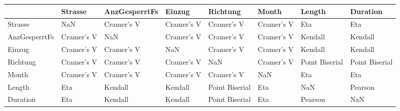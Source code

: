 \begin{tabular}{llllllll}
\toprule
{} &     Strasse & AnzGesperrtFs &      Einzug &        Richtung &       Month &          Length &        Duration \\
\midrule
Strasse       &         NaN &    Cramer's V &  Cramer's V &      Cramer's V &  Cramer's V &             Eta &             Eta \\
AnzGesperrtFs &  Cramer's V &           NaN &  Cramer's V &      Cramer's V &  Cramer's V &         Kendall &         Kendall \\
Einzug        &  Cramer's V &    Cramer's V &         NaN &      Cramer's V &  Cramer's V &         Kendall &         Kendall \\
Richtung      &  Cramer's V &    Cramer's V &  Cramer's V &             NaN &  Cramer's V &  Point Biserial &  Point Biserial \\
Month         &  Cramer's V &    Cramer's V &  Cramer's V &      Cramer's V &         NaN &             Eta &             Eta \\
Length        &         Eta &       Kendall &     Kendall &  Point Biserial &         Eta &             NaN &         Pearson \\
Duration      &         Eta &       Kendall &     Kendall &  Point Biserial &         Eta &         Pearson &             NaN \\
\bottomrule
\end{tabular}

